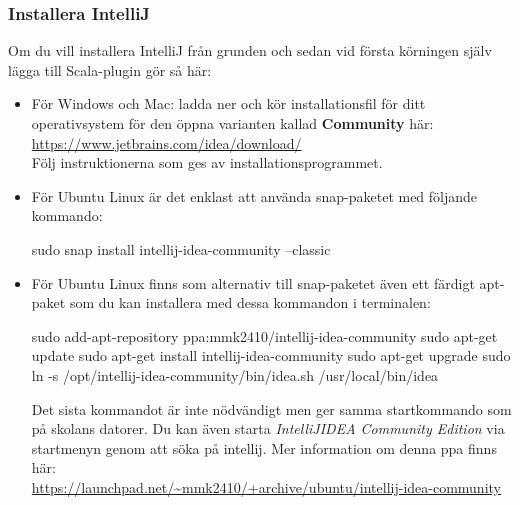 



\subsubsection{Installera IntelliJ}

Om du vill installera IntelliJ från grunden och sedan vid första körningen själv lägga till Scala-plugin gör så här:
\begin{itemize}
  \item För Windows och Mac: ladda ner och kör installationsfil för ditt operativsystem för den öppna varianten kallad \textbf{Community} här: \\
  \url{https://www.jetbrains.com/idea/download/} \\
  Följ instruktionerna som ges av installationsprogrammet.
  
  \item För Ubuntu Linux är det enklast att använda snap-paketet med följande kommando:
\begin{REPLnonum}
sudo snap install intellij-idea-community --classic
\end{REPLnonum}
\item För Ubuntu Linux finns som alternativ till snap-paketet även ett färdigt apt-paket som du kan installera med dessa kommandon i terminalen:
\begin{REPLnonum}
sudo add-apt-repository ppa:mmk2410/intellij-idea-community
sudo apt-get update
sudo apt-get install intellij-idea-community
sudo apt-get upgrade
sudo ln -s /opt/intellij-idea-community/bin/idea.sh /usr/local/bin/idea
\end{REPLnonum}
Det sista kommandot är inte nödvändigt men ger samma startkommando som på skolans datorer. Du kan även starta \textit{IntelliJIDEA Community Edition} via startmenyn genom att söka på intellij.
Mer information om denna ppa finns här:\\ \url{https://launchpad.net/~mmk2410/+archive/ubuntu/intellij-idea-community}

\end{itemize}

